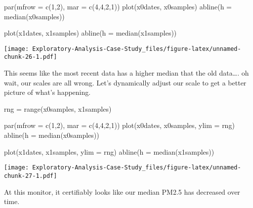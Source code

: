 \documentclass[
]{article}
\newenvironment{Shaded}{\begin{snugshade}}{\end{snugshade}}
\newcommand{\AttributeTok}[1]{\textcolor[rgb]{0.77,0.63,0.00}{#1}}
\newcommand{\DecValTok}[1]{\textcolor[rgb]{0.00,0.00,0.81}{#1}}
\newcommand{\FunctionTok}[1]{\textcolor[rgb]{0.00,0.00,0.00}{#1}}
\newcommand{\NormalTok}[1]{#1}
\newcommand{\OtherTok}[1]{\textcolor[rgb]{0.56,0.35,0.01}{#1}}
\begin{document}
\begin{Shaded}
\begin{Highlighting}[]
\FunctionTok{par}\NormalTok{(}\AttributeTok{mfrow =} \FunctionTok{c}\NormalTok{(}\DecValTok{1}\NormalTok{,}\DecValTok{2}\NormalTok{), }\AttributeTok{mar =} \FunctionTok{c}\NormalTok{(}\DecValTok{4}\NormalTok{,}\DecValTok{4}\NormalTok{,}\DecValTok{2}\NormalTok{,}\DecValTok{1}\NormalTok{))}
\FunctionTok{plot}\NormalTok{(x0dates, x0samples)}
\FunctionTok{abline}\NormalTok{(}\AttributeTok{h =} \FunctionTok{median}\NormalTok{(x0samples))}

\FunctionTok{plot}\NormalTok{(x1dates, x1samples)}
\FunctionTok{abline}\NormalTok{(}\AttributeTok{h =} \FunctionTok{median}\NormalTok{(x1samples))}
\end{Highlighting}
\end{Shaded}

\texttt{[image: Exploratory-Analysis-Case-Study\_files/figure-latex/unnamed-chunk-26-1.pdf]}

This seems like the most recent data has a higher median that the old
data\ldots. oh wait, our scales are all wrong. Let's dynamically adjust
our scale to get a better picture of what's happening.

\begin{Shaded}
\begin{Highlighting}[]
\NormalTok{rng }\OtherTok{=} \FunctionTok{range}\NormalTok{(x0samples, x1samples)}



\FunctionTok{par}\NormalTok{(}\AttributeTok{mfrow =} \FunctionTok{c}\NormalTok{(}\DecValTok{1}\NormalTok{,}\DecValTok{2}\NormalTok{), }\AttributeTok{mar =} \FunctionTok{c}\NormalTok{(}\DecValTok{4}\NormalTok{,}\DecValTok{4}\NormalTok{,}\DecValTok{2}\NormalTok{,}\DecValTok{1}\NormalTok{))}
\FunctionTok{plot}\NormalTok{(x0dates, x0samples, }\AttributeTok{ylim =}\NormalTok{ rng)}
\FunctionTok{abline}\NormalTok{(}\AttributeTok{h =} \FunctionTok{median}\NormalTok{(x0samples))}

\FunctionTok{plot}\NormalTok{(x1dates, x1samples, }\AttributeTok{ylim =}\NormalTok{ rng)}
\FunctionTok{abline}\NormalTok{(}\AttributeTok{h =} \FunctionTok{median}\NormalTok{(x1samples))}
\end{Highlighting}
\end{Shaded}

\texttt{[image: Exploratory-Analysis-Case-Study\_files/figure-latex/unnamed-chunk-27-1.pdf]}

At this monitor, it certifiably looks like our median PM2.5 has
decreased over time.
\end{document}
